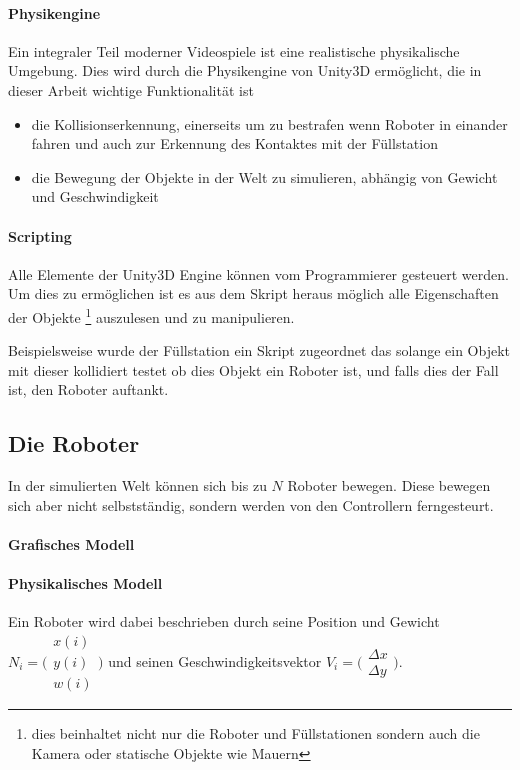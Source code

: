 \documentclass[
    12pt,
    bibliography=totoc,
    ngerman
]{scrartcl}
\begin{document}
\paragraph{Physikengine}
Ein integraler Teil moderner Videospiele ist eine realistische physikalische Umgebung. Dies wird durch die Physikengine von Unity3D erm{\"{o}}glicht, die in dieser
Arbeit wichtige Funktionalit{\"{a}}t ist
\begin{itemize}
\item die Kollisionserkennung, einerseits um zu bestrafen wenn Roboter in einander fahren und auch zur Erkennung des Kontaktes mit der F{\"{u}}llstation
\item die Bewegung der Objekte in der Welt zu simulieren, abh{\"{a}}ngig von Gewicht und Geschwindigkeit
\end{itemize}

\paragraph{Scripting}
Alle Elemente der Unity3D Engine k{\"{o}}nnen vom Programmierer gesteuert werden. Um dies zu erm{\"{o}}glichen ist es aus dem Skript heraus m{\"{o}}glich alle Eigenschaften
der Objekte \footnote{dies beinhaltet nicht nur die Roboter und F{\"{u}}llstationen sondern auch die Kamera oder statische Objekte wie Mauern} auszulesen und zu manipulieren.

Beispielsweise wurde der F{\"{u}}llstation ein Skript zugeordnet das solange ein Objekt mit dieser kollidiert testet ob dies Objekt ein Roboter ist, und falls dies der Fall ist,
den Roboter auftankt.

\subsection{Die Roboter}\label{robot}
In der simulierten Welt k{\"{o}}nnen sich bis zu $N$ Roboter bewegen. Diese bewegen sich aber nicht selbstst{\"{a}}ndig, sondern werden von den Controllern ferngesteurt.
\paragraph{Grafisches Modell} 

\paragraph{Physikalisches Modell}
Ein Roboter wird dabei beschrieben durch seine Position und Gewicht
$ N_i = \bigl(\begin{smallmatrix} x(i) \\ y(i) \\ w(i) \end{smallmatrix}\bigr)$ und
seinen Geschwindigkeitsvektor
$ V_i = \bigl(\begin{smallmatrix} \Delta x \\ \Delta y \end{smallmatrix}\bigr)$.
\end{document}
